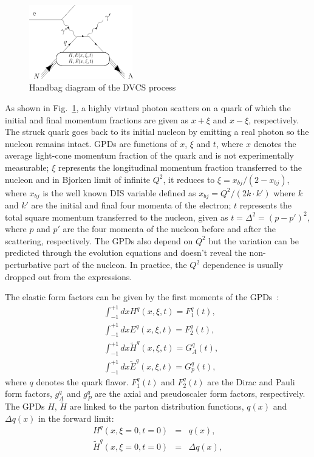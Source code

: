 \begin{figure}[!ht]
 \begin{center}
  \includegraphics[width=0.4\textwidth]{./figures/dvcs.pdf}
   \caption[Handbag diagram of the DVCS process]{\footnotesize{Handbag diagram of the DVCS process}}
  \label{dvcs_gpd}
 \end{center}
\end{figure}
 As shown in Fig.~\ref{dvcs_gpd}, a highly virtual photon scatters on a quark of which the initial and final momentum fractions are given as $x+\xi$ and $x-\xi$, respectively. The struck quark goes back to its initial nucleon by emitting a real photon so the nucleon remains intact. GPDs are functions of $x$, $\xi$ and $t$, where $x$ denotes the average light-cone momentum fraction of the quark and is not experimentally measurable; $\xi$ represents the longitudinal momentum fraction transferred to the nucleon and in Bjorken limit of infinite $Q^{2}$, it reduces to $\xi=x_{bj}/(2-x_{bj})$, where $x_{bj}$ is the well known DIS variable defined as $x_{bj}=Q^{2}/(2k\cdot k')$ where $k$ and $k'$ are the initial and final four momenta of the electron; $t$ represents the total square momentum transferred to the nucleon, given as $t=\Delta^{2}=(p-p')^{2}$, where $p$ and $p'$ are the four momenta of the nucleon before and after the scattering, respectively. The GPDs also depend on $Q^{2}$ but the variation can be predicted through the evolution equations and doesn't reveal the non-perturbative part of the nucleon. In practice, the $Q^{2}$ dependence is usually dropped out from the expressions.

 The elastic form factors can be given by the first moments of the GPDs~\cite{Gui03}:
\begin{align}
   & \int_{-1}^{+1} dx H^{q}(x,\xi,t)=F_{1}^{q}(t),\\
& \int_{-1}^{+1} dx E^{q}(x,\xi,t)=F_{2}^{q}(t),\\
& \int_{-1}^{+1} dx \tilde H^{q}(x,\xi,t)=G_{A}^{q}(t),\\
& \int_{-1}^{+1} dx \tilde E^{q}(x,\xi,t)=G_{p}^{q}(t),
\end{align}
where $q$ denotes the quark flavor. $F_{1}^{q}(t)$ and $F_{2}^{q}(t)$ are the Dirac and Pauli form factors, $g_{A}^{q}$ and $g_{P}^{q}$ are the axial and pseudoscaler form factors, respectively. The GPDs $H$, $\tilde H$ are linked to the parton distribution functions, $q(x)$ and $\Delta q(x)$ in the forward limit:
\begin{eqnarray}
  H^{q}(x,\xi=0,t=0)&=&q(x), \\
  \tilde H^{q}(x,\xi=0,t=0)&=&\Delta q(x), 
\end{eqnarray}

